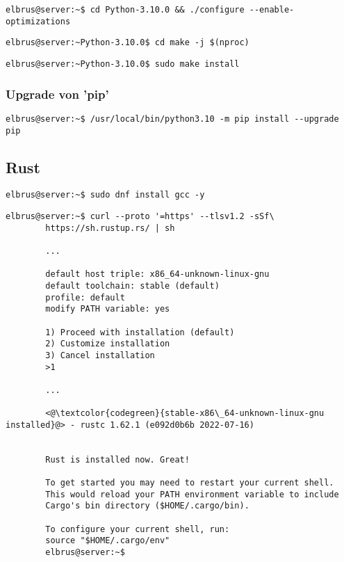 \documentclass{article}
\begin{document}
	\begin{lstlisting}[caption={Wechseln zu source Verzeichniss. Und ausführen des Konfigurations Scripts.}]
		elbrus@server:~$ cd Python-3.10.0 && ./configure --enable-optimizations
	\end{lstlisting}

	\begin{lstlisting}[caption={Starten des build Prozesses.}]
		elbrus@server:~Python-3.10.0$ cd make -j $(nproc)
	\end{lstlisting}
	
	\begin{lstlisting}[caption={Installieren von Python.}]
		elbrus@server:~Python-3.10.0$ sudo make install
	\end{lstlisting}
	
	\subsubsection{Upgrade von 'pip'}
	\begin{lstlisting}[caption={Upgraden von 'pip'.}]
		elbrus@server:~$ /usr/local/bin/python3.10 -m pip install --upgrade pip
	\end{lstlisting}

	\subsection{Rust}
	
	\begin{lstlisting}[caption={Installieren von GNU Compiler Collection.}]
		elbrus@server:~$ sudo dnf install gcc -y
	\end{lstlisting}
	
	\lstset{style=commands}
	\begin{lstlisting}[caption={Installieren von Rust.}]
		elbrus@server:~$ curl --proto '=https' --tlsv1.2 -sSf\
		https://sh.rustup.rs/ | sh
		 
		...
		 
		default host triple: x86_64-unknown-linux-gnu
		default toolchain: stable (default)
		profile: default
		modify PATH variable: yes
		
		1) Proceed with installation (default)
		2) Customize installation
		3) Cancel installation
		>1
		
		...
		
		<@\textcolor{codegreen}{stable-x86\_64-unknown-linux-gnu installed}@> - rustc 1.62.1 (e092d0b6b 2022-07-16)
		
		
		Rust is installed now. Great!
		
		To get started you may need to restart your current shell.
		This would reload your PATH environment variable to include
		Cargo's bin directory ($HOME/.cargo/bin).
		
		To configure your current shell, run:
		source "$HOME/.cargo/env"
		elbrus@server:~$
	\end{lstlisting}
\end{document}
